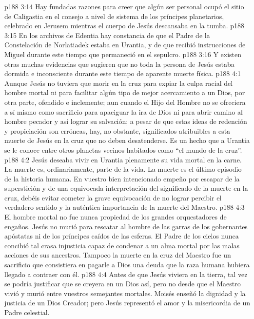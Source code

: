\vs p188 3:14 Hay fundadas razones para creer que algún ser personal ocupó el sitio de Caligastia en el consejo a nivel de sistema de los príncipes planetarios, celebrado en Jerusem mientras el cuerpo de Jesús descansaba en la tumba.
\vs p188 3:15 En los archivos de Edentia hay constancia de que el Padre de la Constelación de Norlatiadek estaba en Urantia, y de que recibió instrucciones de Miguel durante este tiempo que permaneció en el sepulcro.
\vs p188 3:16 Y existen otras muchas evidencias que sugieren que no toda la persona de Jesús estaba dormida e inconsciente durante este tiempo de aparente muerte física.
\vs p188 4:1 Aunque Jesús no tuviera que morir en la cruz para expiar la culpa racial del hombre mortal ni para facilitar algún tipo de mejor acercamiento a un Dios, por otra parte, ofendido e inclemente; aun cuando el Hijo del Hombre no se ofreciera a sí mismo como sacrificio para apaciguar la ira de Dios ni para abrir camino al hombre pecador y así lograr su salvación; a pesar de que estas ideas de redención y propiciación son erróneas, hay, no obstante, significados atribuibles a esta muerte de Jesús en la cruz que no deben desatenderse. Es un hecho que a Urantia se le conoce entre otros planetas vecinos habitados como “el mundo de la cruz”.
\vs p188 4:2 Jesús deseaba vivir en Urantia plenamente su vida mortal en la carne. La muerte es, ordinariamente, parte de la vida. La muerte es el último episodio de la historia humana. En vuestro bien intencionado empeño por escapar de la superstición y de una equivocada interpretación del significado de la muerte en la cruz, debéis evitar cometer la grave equivocación de no lograr percibir el verdadero sentido y la auténtica importancia de la muerte del Maestro.
\vs p188 4:3 \pc El hombre mortal no fue nunca propiedad de los grandes orquestadores de engaños. Jesús no murió para rescatar al hombre de las garras de los gobernantes apóstatas ni de los príncipes caídos de las esferas. El Padre de los cielos nunca concibió tal crasa injusticia capaz de condenar a un alma mortal por las malas acciones de sus ancestros. Tampoco la muerte en la cruz del Maestro fue un sacrificio que consistiera en pagarle a Dios una deuda que la raza humana hubiera llegado a contraer con él.
\vs p188 4:4 Antes de que Jesús viviera en la tierra, tal vez se podría justificar que se creyera en un Dios así, pero no desde que el Maestro vivió y murió entre vuestros semejantes mortales. Moisés enseñó la dignidad y la justicia de un Dios Creador; pero Jesús representó el amor y la misericordia de un Padre celestial.
